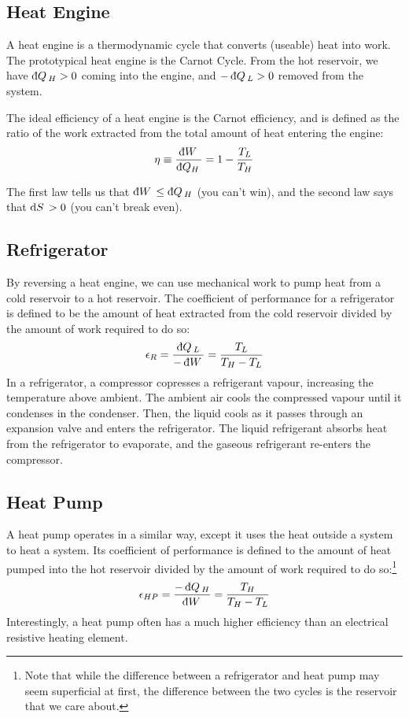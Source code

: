 \subsection{Heat Engine}
A heat engine is a thermodynamic cycle that converts (useable) heat into work. The prototypical heat engine is the Carnot Cycle. From the hot reservoir, we have \(\dbar Q_H>0\) coming into the engine, and \(-\dbar Q_L>0\) removed from the system. 

The ideal efficiency of a heat engine is the Carnot efficiency, and is defined as the ratio of the work extracted from the total amount of heat entering the engine:
\begin{equation}
	\eta \equiv \frac{\dbar{W}}{\dbar{Q_H}}=1-\frac{T_L}{T_H}
\end{equation}

The first law tells us that \(\dbar{W}\leq \dbar{Q}_{H}\) (you can't win), and the second law says that \(\d{S}>0\) (you can't break even).

\subsection{Refrigerator}
By reversing a heat engine, we can use mechanical work to pump heat from a cold reservoir to a hot reservoir. The coefficient of performance for a refrigerator is defined to be the amount of heat extracted from the cold reservoir divided by the amount of work required to do so:
\begin{equation}
	\epsilon_R=\frac{\dbar{Q}_L}{-\dbar{W}}=\frac{T_L}{T_H-T_L}
\end{equation}
In a refrigerator, a compressor copresses a refrigerant vapour, increasing the temperature above ambient. The ambient air cools the compressed vapour until it condenses in the condenser. Then, the liquid cools as it passes through an expansion valve and enters the refrigerator. The liquid refrigerant absorbs heat from the refrigerator to evaporate, and the gaseous refrigerant re-enters the compressor.

\subsection{Heat Pump}
A heat pump operates in a similar way, except it uses the heat outside a system to heat a system. Its coefficient of performance is defined to the amount of heat pumped into the hot reservoir divided by the amount of work required to do so:\footnote{Note that while the difference between a refrigerator and heat pump may seem superficial at first, the difference between the two cycles is the reservoir that we care about.}
\begin{equation}
	\epsilon_{HP}=\frac{-\dbar{Q}_H}{\dbar{W}} = \frac{T_H}{T_H-T_L}
\end{equation}
Interestingly, a heat pump often has a much higher efficiency than an electrical resistive heating element.


